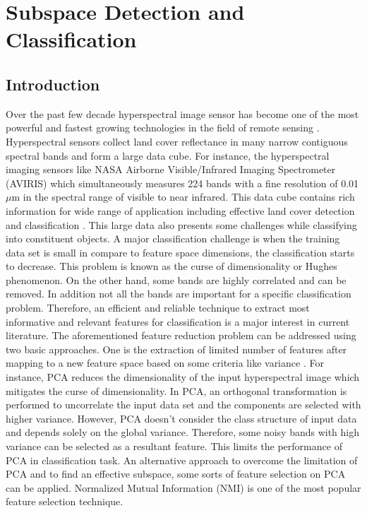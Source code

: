 \documentclass[document.tex]{subfiles}
\begin{document}
\chapter{Subspace Detection and Classification}
\section{Introduction}
\noindent Over the past few decade hyperspectral image sensor
has become one of the most powerful and fastest growing technologies in the field of remote sensing \cite{3}. Hyperspectral sensors collect land cover reflectance in many narrow contiguous spectral bands and form a large data cube\cite{3}. For instance, the hyperspectral imaging sensors like NASA Airborne Visible/Infrared Imaging
Spectrometer (AVIRIS) which simultaneously measures 224 bands with a fine resolution of 0.01 $\mu$m in the spectral range of visible to near infrared. This data cube contains rich information for wide range of application including effective land cover detection and classification \cite{24}. This large data also presents some challenges while classifying into constituent objects. A major classification challenge is when the training data set is small in compare to feature space dimensions, the classification starts to decrease. This problem is known as the curse of dimensionality or Hughes phenomenon\cite{4}\cite{25}\cite{26}. On the other hand, some bands are highly correlated and can be removed. In addition not all the bands are important for a specific classification problem. Therefore, an efficient and reliable technique to extract most informative and relevant features for classification is a major interest in current literature. The aforementioned feature reduction problem can be addressed using two basic approaches\cite{2}. One is the extraction of limited number of features after mapping to a new feature space based on some criteria like variance \cite{27,28}\cite{8}\cite{7}. For instance, PCA reduces the dimensionality of the input hyperspectral image which mitigates the curse of dimensionality. In PCA, an orthogonal transformation is performed to uncorrelate the input data set and the components are selected with higher variance. However, PCA doesn't consider the class structure of input data and depends solely on the global variance. Therefore, some noisy bands with high variance can be selected as a resultant feature. This limits the performance of PCA in classification task. An alternative approach to overcome the limitation of PCA and to find an effective subspace, some sorts of feature selection on PCA can be applied\cite{34}. Normalized Mutual Information (NMI) is one of the most popular feature selection technique\cite{9,10,20}.\\
\end{document}
